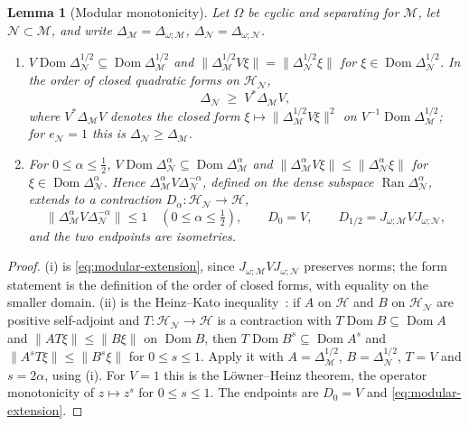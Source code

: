 \documentclass[a4paper,11pt]{article}
\newtheorem{lemma}[theorem]{Lemma}
\theoremstyle{definition}
\newcommand{\mN}{\mathcal{N}}
\newcommand{\mH}{\mathcal{H}}
\newcommand{\mM}{\mathcal{M}}
\begin{document}
\begin{lemma}[Modular monotonicity]\label{lem:modular-monotonicity}
Let $\Omega$ be cyclic and separating for $\mM$, let $\mN\subset\mM$, and write $\Delta_{\mM}=\Delta_{\omega;\mM}$, $\Delta_{\mN}=\Delta_{\omega;\mN}$.
\begin{enumerate}
 \item[\rm(i)] $V\operatorname{Dom}\Delta_{\mN}^{1/2}\subseteq\operatorname{Dom}\Delta_{\mM}^{1/2}$ and $\|\Delta_{\mM}^{1/2}V\xi\|=\|\Delta_{\mN}^{1/2}\xi\|$ for $\xi\in\operatorname{Dom}\Delta_{\mN}^{1/2}$. In the order of closed quadratic forms on $\mH_{\mN}$,
 \begin{equation}
  \Delta_{\mN}\;\geq\;V^*\Delta_{\mM}V ,
  \label{eq:modular-inequality}
 \end{equation}
 where $V^*\Delta_{\mM}V$ denotes the closed form $\xi\mapsto\|\Delta_{\mM}^{1/2}V\xi\|^2$ on $V^{-1}\operatorname{Dom}\Delta_{\mM}^{1/2}$; for $e_{\mN}=1$ this is $\Delta_{\mN}\geq\Delta_{\mM}$.
 \item[\rm(ii)] For $0\le\alpha\le\tfrac12$, $V\operatorname{Dom}\Delta_{\mN}^{\alpha}\subseteq\operatorname{Dom}\Delta_{\mM}^{\alpha}$ and $\|\Delta_{\mM}^{\alpha}V\xi\|\le\|\Delta_{\mN}^{\alpha}\xi\|$ for $\xi\in\operatorname{Dom}\Delta_{\mN}^{\alpha}$. Hence $\Delta_{\mM}^{\alpha}V\Delta_{\mN}^{-\alpha}$, defined on the dense subspace $\operatorname{Ran}\Delta_{\mN}^{\alpha}$, extends to a contraction $D_\alpha:\mH_{\mN}\to\mathcal H$,
 \begin{equation}
  \|\Delta_{\mM}^{\alpha}V\Delta_{\mN}^{-\alpha}\|\le1\quad(0\le\alpha\le\tfrac12),
  \qquad D_0=V,\qquad D_{1/2}=J_{\omega;\mM}VJ_{\omega;\mN},
  \label{eq:characteristic-bounded}
 \end{equation}
 and the two endpoints are isometries.
\end{enumerate}
\end{lemma}
\begin{proof}
(i) is \eqref{eq:modular-extension}, since $J_{\omega;\mM}VJ_{\omega;\mN}$ preserves norms; the form statement is the definition of the order of closed forms, with equality on the smaller domain. (ii) is the Heinz--Kato inequality~\cite{Kato1952}: if $A$ on $\mathcal H$ and $B$ on $\mH_{\mN}$ are positive self-adjoint and $T:\mH_{\mN}\to\mathcal H$ is a contraction with $T\operatorname{Dom}B\subseteq\operatorname{Dom}A$ and $\|AT\xi\|\le\|B\xi\|$ on $\operatorname{Dom}B$, then $T\operatorname{Dom}B^{s}\subseteq\operatorname{Dom}A^{s}$ and $\|A^{s}T\xi\|\le\|B^{s}\xi\|$ for $0\le s\le1$. Apply it with $A=\Delta_{\mM}^{1/2}$, $B=\Delta_{\mN}^{1/2}$, $T=V$ and $s=2\alpha$, using (i). For $V=1$ this is the L\"owner--Heinz theorem, the operator monotonicity of $z\mapsto z^{s}$ for $0\le s\le1$. The endpoints are $D_0=V$ and \eqref{eq:modular-extension}.
\end{proof}
\end{document}

